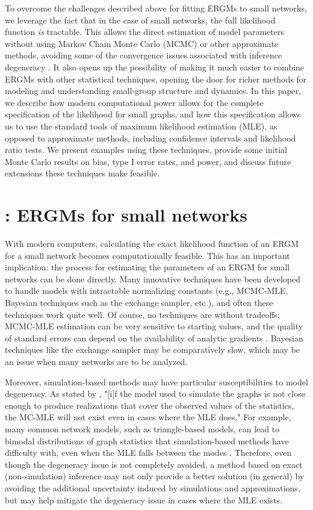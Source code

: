 \documentclass[12pt]{article}
\begin{document}
To overcome the challenges described above for fitting ERGMs to small networks, we leverage the fact that in the case of small networks, the full likelihood function \textit{is} tractable. This allows the direct estimation of model parameters without using Markov Chain Monte Carlo (MCMC) or other approximate methods, avoiding some of the convergence issues associated with inference degeneracy \cite{Handcock2003}. It also opens up the possibility of making it much easier to combine ERGMs with other statistical techniques, opening the door for richer methods for modeling and understanding small-group structure and dynamics. In this paper, we describe how modern computational power allows for the complete specification of the likelihood for small graphs, and how this specification allows us to use the standard tools of maximum likelihood estimation (MLE), as opposed to approximate methods, including confidence intervals and likelihood ratio tests. We present examples using these techniques, provide some initial Monte Carlo results on bias, type I error rates, and power, and discuss future extensions these techniques make feasible.

\section{\ergmitos{}: ERGMs for small networks}

With modern computers, calculating the exact likelihood function of an ERGM for a small network becomes computationally feasible. This has an important implication: the process for estimating the parameters of an ERGM for small networks can be done directly. Many innovative techniques have been developed to handle models with intractable normalizing constants (e.g., MCMC-MLE, Bayesian techniques such as the exchange sampler, etc.), and often these techniques work quite well. Of course, no techniques are without tradeoffs; MCMC-MLE estimation can be very sensitive to starting values, and the quality of standard errors can depend on the availability of analytic gradients \cite{Park2018}. Bayesian techniques like the exchange sampler \cite{Moller2006} may be comparatively slow, which may be an issue when many networks are to be analyzed.

Moreover, simulation-based methods may have particular susceptibilities to model degeneracy. As stated by \cite[p. 7]{Handcock2003}, "[i]f the model used to simulate the graphs is not close enough to produce realizations that cover the observed values of the statistics, the MC-MLE will not exist even in cases where the MLE does." For example, many common network models, such as triangle-based models, can lead to bimodal distributions of graph statistics that simulation-based methods have difficulty with, even when the MLE falls between the modes \cite{Hunteretal2012}. Therefore, even though the degeneracy issue is not completely avoided, a method based on exact (non-simulation) inference may not only provide a better solution (in general) by avoiding the additional uncertainty induced by simulations and approximations, but may help mitigate the degeneracy issue in cases where the MLE exists.
\end{document}
